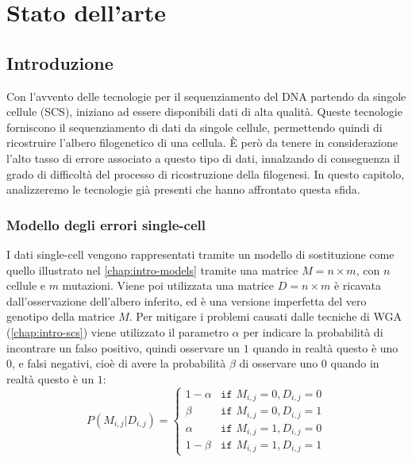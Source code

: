
\chapter{Stato dell'arte}
\label{chap:art}


\section{Introduzione}
\label{chap:art-intro}
Con l'avvento delle tecnologie per il sequenziamento del DNA partendo da singole cellule (SCS), iniziano ad essere disponibili dati di alta qualità. Queste tecnologie forniscono il sequenziamento di dati da singole cellule, permettendo quindi di ricostruire l'albero filogenetico di una cellula. È però da tenere in considerazione l'alto tasso di errore associato a questo tipo di dati, innalzando di conseguenza il grado di difficoltà del processo di ricostruzione della filogenesi. 
In questo capitolo, analizzeremo le tecnologie già presenti che hanno affrontato questa sfida.

\subsection{Modello degli errori single-cell}
\label{chap:art-intro-model-matrix}
I dati single-cell vengono rappresentati tramite un modello di sostituzione come quello illustrato nel \autoref{chap:intro-models} tramite una matrice $M = n \times m$, con $n$ cellule e $m$ mutazioni. Viene poi utilizzata una matrice $D = n \times m$ è ricavata dall'osservazione dell'albero inferito, ed è una versione imperfetta del vero genotipo della matrice $M$. Per mitigare i problemi causati dalle tecniche di WGA (\autoref{chap:intro-scs}) viene utilizzato il parametro $\alpha$ per indicare la probabilità di incontrare un falso positivo, quindi osservare un $1$ quando in realtà questo è uno $0$, e falsi negativi, cioè di avere la probabilità $\beta$ di osservare uno $0$ quando in realtà questo è un $1$:
\begin{equation}
    \label{eq:art-intro-model-matrix}
    P(M_{i,j} | D_{i,j}) = \begin{cases}
        1 - \alpha  & \texttt{if } M_{i,j} = 0, D_{i,j} = 0 \\
        \beta       & \texttt{if } M_{i,j} = 0, D_{i,j} = 1 \\
        \alpha      & \texttt{if } M_{i,j} = 1, D_{i,j} = 0 \\
        1 - \beta   & \texttt{if } M_{i,j} = 1, D_{i,j} = 1
    \end{cases}
\end{equation}


